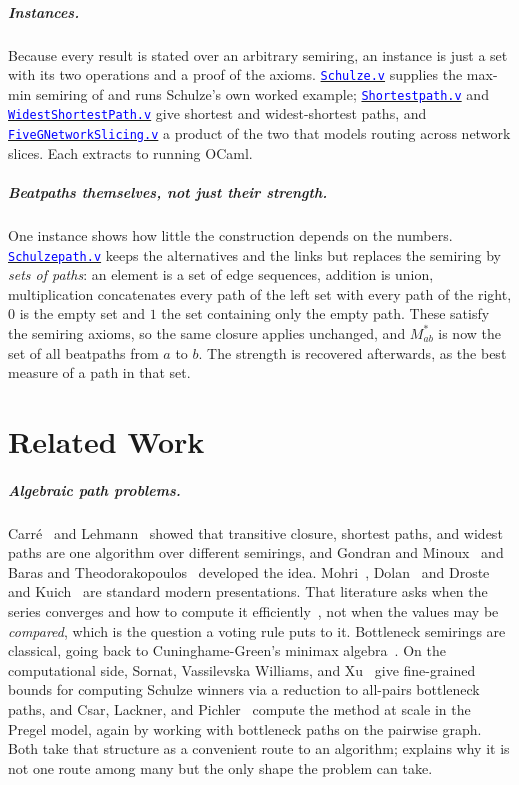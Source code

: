 \documentclass[a4paper,UKenglish,cleveref,autoref,thm-restate,anonymous]{lipics-v2021}
\newcommand{\Mstar}{M^{\ast}}
\newcommand{\anonrepo}{https://anonymous.4open.science/r/Semiring_graph_algorithm-000E}
\newcommand{\rocqfile}[2]{\href{\anonrepo/#1}{\textcolor{blue}{\texttt{#2}}}}
\begin{document}
\subparagraph*{Instances.}
Because every result is stated over an arbitrary semiring, an instance is
just a set with its two operations and a proof of the axioms.
\rocqfile{examples/Schulze.v}{Schulze.v} supplies the max-min semiring of
 and runs Schulze's own worked example;
\rocqfile{examples/Shortestpath.v}{Shortestpath.v} and
\rocqfile{examples/WidestShortestPath.v}{Widest\-Shortest\-Path.v} give shortest
and widest-shortest paths, and
\rocqfile{examples/FiveGNetworkSlicing.v}{FiveGNetworkSlicing.v} a product
of the two that models routing across network slices. Each extracts to
running OCaml.

\subparagraph*{Beatpaths themselves, not just their strength.}
One instance shows how little the construction depends on the numbers.
\rocqfile{examples/Schulzepath.v}{Schulzepath.v} keeps the alternatives
and the links but replaces the semiring by \emph{sets of paths}: an
element is a set of edge sequences, addition is union, multiplication
concatenates every path of the left set with every path of the right, $0$
is the empty set and $1$ the set containing only the empty path. These
satisfy the semiring axioms, so the same closure applies unchanged, and
$\Mstar_{ab}$ is now the set of all beatpaths from $a$ to $b$. The
strength is recovered afterwards, as the best measure of a path in that
set.


\section{Related Work}\label{sec:related}
\subparagraph*{Algebraic path problems.}
Carr\'e~\cite{carre1971algebra} and Lehmann~\cite{lehmann1977} showed that
transitive closure, shortest paths, and widest paths are one algorithm over
different semirings, and Gondran and Minoux~\cite{10.5555/1386688} and Baras
and Theodorakopoulos~\cite{baras2022path} developed the
idea. Mohri~\cite{10.5555/639508.639512},
Dolan~\cite{10.1145/2500365.2500613} and Droste and
Kuich~\cite{Droste2009} are standard modern presentations. That literature
asks when the series converges and how to compute it
efficiently~\cite{vassilevska2009all}, not when the values may be
\emph{compared}, which is the question a voting rule puts to it. Bottleneck
semirings are classical, going back to Cuninghame-Green's minimax
algebra~\cite{cuninghamegreen1979minimax}. On the computational side,
Sornat, Vassilevska Williams, and Xu~\cite{sornat2021schulze} give
fine-grained bounds for computing Schulze winners via a reduction to
all-pairs bottleneck paths, and Csar, Lackner, and
Pichler~\cite{csar2018computing} compute the method at scale in the Pregel
model, again by working with bottleneck paths on the pairwise graph. Both
take that structure as a convenient route to an algorithm;
 explains why it is not one route among many but the
only shape the problem can take.
\end{document}
